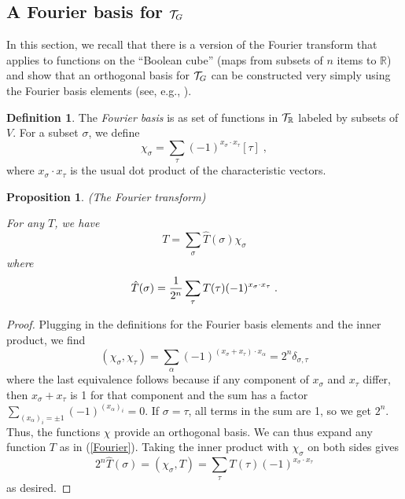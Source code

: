 \documentclass[12pt]{article}
\newtheorem{proposition}[theorem]{Proposition}
\theoremstyle{definition}
\newtheorem{definition}[theorem]{Definition}
\begin{document}
\subsection{A Fourier basis for ${\cal T}_G$}

In this section, we recall that there is a version of the Fourier transform that applies to functions on the ``Boolean cube'' (maps from subsets of $n$ items to $\mathbb{R}$) and show that an orthogonal basis for ${\cal T}_G$ can be constructed very simply using the Fourier basis elements (see, e.g., \cite{ODonnell2014}).

\begin{definition}
The {\it Fourier basis} is as set of functions in ${\cal T}_\mathbb{R}$ labeled by subsets of $V$. For a subset $\sigma$, we define 
\begin{equation}
\chi_\sigma = \sum_\tau (-1)^{x_\sigma \cdot x_\tau} [\tau] \; ,
\end{equation}
where $x_\sigma \cdot x_\tau$ is the usual dot product of the characteristic vectors.
\end{definition}

\begin{proposition}(The Fourier transform)

For any $T$, we have 
\begin{equation}
\label{Fourier}
T = \sum_\sigma \hat{T}(\sigma) \chi_\sigma
\end{equation}
where
\begin{equation}
\label{defFour}
\hat{T}(\sigma) = {1 \over 2^n} \sum_\tau T(\tau) (-1)^{x_\sigma \cdot x_\tau}\; .
\end{equation}
\end{proposition}
\begin{proof}
    Plugging in the definitions for the Fourier basis elements and the inner product, we find 
\[
(\chi_\sigma, \chi_\tau) = \sum_\alpha (-1)^{(x_\sigma + x_\tau) \cdot x_\alpha} =  2^n \delta_{\sigma, \tau}
\]
where the last equivalence follows because if any component of $x_\sigma$ and $x_\tau$ differ, then $x_\sigma + x_\tau$ is 1 for that component and the sum has a factor $\sum_{(x_\alpha)_i = \pm 1} (-1)^{(x_\alpha)_i} = 0$. If $\sigma = \tau$, all terms in the sum are 1, so we get $2^n$. Thus, the functions $\chi$ provide an orthogonal basis. We can thus expand any function $T$ as in (\ref{Fourier}). Taking the inner product with $\chi_\sigma$ on both sides gives
\[
2^n \hat{T}(\sigma) = (\chi_\sigma, T) =  \sum_\tau T(\tau) (-1)^{x_\sigma \cdot x_\tau}
\]
as desired.
\end{proof}
\end{document}
